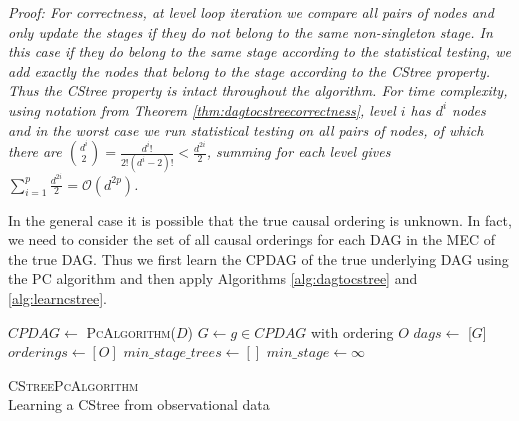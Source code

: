 \documentclass{tufte-book}
\begin{document}
\begin{Definition}
\begin{theorem}
\end{theorem}

\textit{Proof:
For correctness, at level loop iteration we compare all pairs of nodes and only update the stages if they do not belong to the same non-singleton stage. In this case if they do belong to the same stage according to the statistical testing, we add exactly the nodes that belong to the stage according to the CStree property. Thus the CStree property is intact throughout the algorithm. For time complexity, using notation from Theorem \ref{thm:dagtocstreecorrectness}, level $i$ has $d^i$ nodes and in the worst case we run statistical testing on all pairs of nodes, of which there are ${d^i \choose 2} = \frac{d^i !}{2! (d^i - 2)!} < \frac{d^{2i}}{2}$, summing for each level gives $\sum_{i=1}^p \frac{d^{2i}}{2}  = \mathcal{O}(d^{2p})$.
}

In the general case it is possible that the true causal ordering is unknown. In fact, we need to consider the set of all causal orderings for each DAG in the MEC of the true DAG. Thus we first learn the CPDAG of the true underlying DAG using the PC algorithm and then apply Algorithms \ref{alg:dagtocstree} and \ref{alg:learncstree}.

\begin{algorithm}\label{alg:cstreepc}
\SetAlgoLined
{}
$CPDAG \gets$ \textsc{PcAlgorithm}($D$)\;
{
$G \gets g \in CPDAG$ with ordering $O$\;
$dags \gets$ [$G$]\;
$orderings \gets [O]$\;
}
$min\_stage\_trees \gets []$\;
$min\_stage \gets \infty$\;
\caption{\textsc{CStreePcAlgorithm} \\ Learning a CStree from observational data}

\end{algorithm}



\end{Definition}
\end{document}
